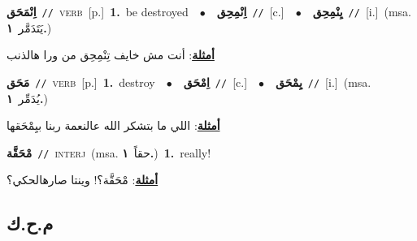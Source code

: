 \documentclass[10pt,a4paper,twoside]{article} %
\begin{document}
\begin{multicols}{2}
{\setlength\topsep{0pt}\textbf{\foreignlanguage{arabic}{اِنْمَحَق}}\ {\color{gray}\texttt{//}\color{black}}\ \textsc{verb}\ [p.]\ \textbf{1.}~be destroyed\ \ $\bullet$\ \ \setlength\topsep{0pt}\textbf{\foreignlanguage{arabic}{اِنْمِحِق}}\ {\color{gray}\texttt{//}\color{black}}\ [c.]\ \ $\bullet$\ \ \setlength\topsep{0pt}\textbf{\foreignlanguage{arabic}{يِنْمِحِق}}\ {\color{gray}\texttt{//}\color{black}}\ [i.]\ \color{gray}(msa. \foreignlanguage{arabic}{يَتَدَمَّر}~\foreignlanguage{arabic}{\textbf{١.}})\color{black}\  \begin{flushright}\color{gray}\foreignlanguage{arabic}{\textbf{\underline{\foreignlanguage{arabic}{أمثلة}}}: أنت مش خايف تِنْمِحِق من ورا هالذنب}\end{flushright}\color{black}} \vspace{2mm}

{\setlength\topsep{0pt}\textbf{\foreignlanguage{arabic}{مَحَق}}\ {\color{gray}\texttt{//}\color{black}}\ \textsc{verb}\ [p.]\ \textbf{1.}~destroy\ \ $\bullet$\ \ \setlength\topsep{0pt}\textbf{\foreignlanguage{arabic}{اِمْحَق}}\ {\color{gray}\texttt{//}\color{black}}\ [c.]\ \ $\bullet$\ \ \setlength\topsep{0pt}\textbf{\foreignlanguage{arabic}{يِمْحَق}}\ {\color{gray}\texttt{//}\color{black}}\ [i.]\ \color{gray}(msa. \foreignlanguage{arabic}{يُدَمِّر}~\foreignlanguage{arabic}{\textbf{١.}})\color{black}\  \begin{flushright}\color{gray}\foreignlanguage{arabic}{\textbf{\underline{\foreignlanguage{arabic}{أمثلة}}}: اللي ما بتشكر الله عالنعمة ربنا بيِمْحَقها}\end{flushright}\color{black}} \vspace{2mm}

{\setlength\topsep{0pt}\textbf{\foreignlanguage{arabic}{مْحَقَّة}}\ {\color{gray}\texttt{//}\color{black}}\ \textsc{interj}\ \color{gray}(msa. \foreignlanguage{arabic}{حقاً}~\foreignlanguage{arabic}{\textbf{١.}})\color{black}\ \textbf{1.}~really!\  \begin{flushright}\color{gray}\foreignlanguage{arabic}{\textbf{\underline{\foreignlanguage{arabic}{أمثلة}}}: مْحَقَّة؟! وينتا صارهالحكي؟}\end{flushright}\color{black}} \vspace{2mm}

\vspace{-3mm}
\subsection*{\color{blue}\foreignlanguage{arabic}{م.ح.ك}\color{blue}{}} 


\end{multicols}
\end{document}
